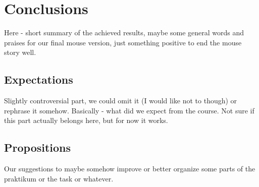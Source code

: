 \section{Conclusions}
Here - short summary of the achieved results, maybe some general words and praises for our final mouse version, just something positive to end the mouse story well.

\subsection{Expectations}
Slightly controversial part, we could omit it (I would like not to though) or rephrase it somehow. Basically - what did we expect from the course. Not sure if this part actually belongs here, but for now it works.
\subsection{Propositions}
Our suggestions to maybe somehow improve or better organize some parts of the praktikum or the task or whatever.


